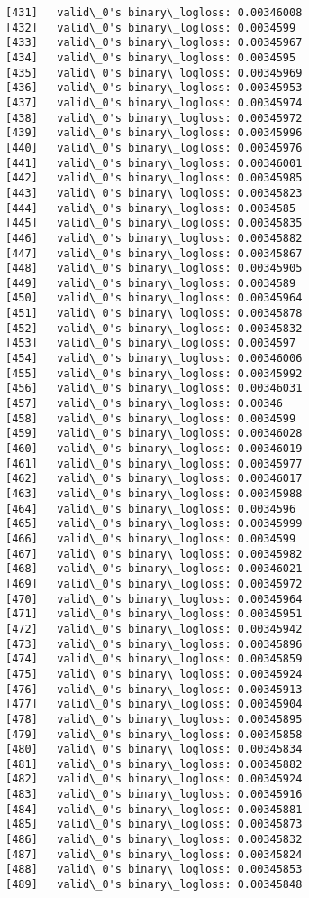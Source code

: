 \documentclass[11pt]{article}
\begin{document}
\begin{Verbatim}[commandchars=\\\{\}]
[431]	valid\_0's binary\_logloss: 0.00346008
[432]	valid\_0's binary\_logloss: 0.0034599
[433]	valid\_0's binary\_logloss: 0.00345967
[434]	valid\_0's binary\_logloss: 0.0034595
[435]	valid\_0's binary\_logloss: 0.00345969
[436]	valid\_0's binary\_logloss: 0.00345953
[437]	valid\_0's binary\_logloss: 0.00345974
[438]	valid\_0's binary\_logloss: 0.00345972
[439]	valid\_0's binary\_logloss: 0.00345996
[440]	valid\_0's binary\_logloss: 0.00345976
[441]	valid\_0's binary\_logloss: 0.00346001
[442]	valid\_0's binary\_logloss: 0.00345985
[443]	valid\_0's binary\_logloss: 0.00345823
[444]	valid\_0's binary\_logloss: 0.0034585
[445]	valid\_0's binary\_logloss: 0.00345835
[446]	valid\_0's binary\_logloss: 0.00345882
[447]	valid\_0's binary\_logloss: 0.00345867
[448]	valid\_0's binary\_logloss: 0.00345905
[449]	valid\_0's binary\_logloss: 0.0034589
[450]	valid\_0's binary\_logloss: 0.00345964
[451]	valid\_0's binary\_logloss: 0.00345878
[452]	valid\_0's binary\_logloss: 0.00345832
[453]	valid\_0's binary\_logloss: 0.0034597
[454]	valid\_0's binary\_logloss: 0.00346006
[455]	valid\_0's binary\_logloss: 0.00345992
[456]	valid\_0's binary\_logloss: 0.00346031
[457]	valid\_0's binary\_logloss: 0.00346
[458]	valid\_0's binary\_logloss: 0.0034599
[459]	valid\_0's binary\_logloss: 0.00346028
[460]	valid\_0's binary\_logloss: 0.00346019
[461]	valid\_0's binary\_logloss: 0.00345977
[462]	valid\_0's binary\_logloss: 0.00346017
[463]	valid\_0's binary\_logloss: 0.00345988
[464]	valid\_0's binary\_logloss: 0.0034596
[465]	valid\_0's binary\_logloss: 0.00345999
[466]	valid\_0's binary\_logloss: 0.0034599
[467]	valid\_0's binary\_logloss: 0.00345982
[468]	valid\_0's binary\_logloss: 0.00346021
[469]	valid\_0's binary\_logloss: 0.00345972
[470]	valid\_0's binary\_logloss: 0.00345964
[471]	valid\_0's binary\_logloss: 0.00345951
[472]	valid\_0's binary\_logloss: 0.00345942
[473]	valid\_0's binary\_logloss: 0.00345896
[474]	valid\_0's binary\_logloss: 0.00345859
[475]	valid\_0's binary\_logloss: 0.00345924
[476]	valid\_0's binary\_logloss: 0.00345913
[477]	valid\_0's binary\_logloss: 0.00345904
[478]	valid\_0's binary\_logloss: 0.00345895
[479]	valid\_0's binary\_logloss: 0.00345858
[480]	valid\_0's binary\_logloss: 0.00345834
[481]	valid\_0's binary\_logloss: 0.00345882
[482]	valid\_0's binary\_logloss: 0.00345924
[483]	valid\_0's binary\_logloss: 0.00345916
[484]	valid\_0's binary\_logloss: 0.00345881
[485]	valid\_0's binary\_logloss: 0.00345873
[486]	valid\_0's binary\_logloss: 0.00345832
[487]	valid\_0's binary\_logloss: 0.00345824
[488]	valid\_0's binary\_logloss: 0.00345853
[489]	valid\_0's binary\_logloss: 0.00345848

\end{Verbatim}
\end{document}
